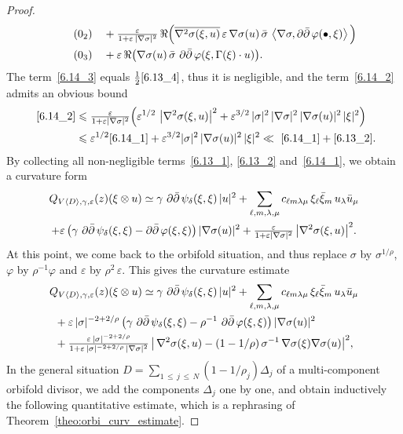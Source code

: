 \documentclass[AHL,Unicode,longabstracts,published]{cedram}
\DeclareMathOperator{\ddbar}{\partial\bar\partial}
\DeclarePairedDelimiter{\abs}{\lvert}{\rvert}
\let\leq\leqslant
\begin{document}
\begin{proof}
\begin{align}
\tag{$\theequation_2$}\label{6.14_2}
&\quad{}+\tfrac{\varepsilon}{ 1+\varepsilon\,\abs{\nabla\sigma}^2}\,\Re\Big(
\overline{\nabla^2\sigma(\xi,u)}\,
\varepsilon\,\nabla\sigma(u)\,\bar\sigma\,
\left\langle\nabla\sigma,\ddbar\varphi(\bullet,\xi)\right\rangle\Big)
\\
\tag{$\theequation_3$}\label{6.14_3}
&\quad{}+\varepsilon\,\Re\big(
\nabla\sigma(u)\,\bar\sigma\,
\ddbar\varphi(\xi,\Gamma(\xi)\cdot u)\big).
\end{align}
The term~\eqref{6.14_3} equals $\tfrac{1}{2}\eqref{6.13_4}$, thus it is negligible, and the term~\eqref{6.14_2} admits an obvious bound
\begin{align*}
~\eqref{6.14_2} &\leq
\tfrac{\varepsilon}{ 1+\varepsilon\abs{\nabla\sigma}^2}
\Big(\varepsilon^{1/2}\,\left|\nabla^2\sigma(\xi,u)\right|^2+\varepsilon^{3/2}\,
\abs{\sigma}^2\,\abs{\nabla\sigma}^2\,\abs{\nabla\sigma(u)}^2\,\abs{\xi}^2\Big)\\
&\leq
\varepsilon^{1/2}\eqref{6.14_1}+
\varepsilon^{3/2}\abs{\sigma}^2\,\abs{\nabla\sigma(u)}^2\,\abs{\xi}^2\ll~\eqref{6.14_1}+\eqref{6.13_2}.
\end{align*}
By collecting all non-negligible terms~\eqref{6.13_1}, \eqref{6.13_2} and~\eqref{6.14_1}, we obtain a curvature form
\begin{multline*}
Q_{V\langle D\rangle,\gamma,\varepsilon}(z)(\xi\otimes u)
\simeq{}\gamma\,\ddbar\psi_\delta(\xi,\xi)\,\abs{u}^2 +\sum_{\ell,m,\lambda,\mu}c_{\ell m\lambda\mu}\,\xi_\ell\bar\xi_m\, u_\lambda\bar u_\mu\\
+\varepsilon\,
\big(\gamma\,\ddbar\psi_\delta(\xi,\xi)-\ddbar\varphi(\xi,\xi)\big)
\,\abs{\nabla\sigma(u)}^2 +\tfrac{\varepsilon}{ 1+\varepsilon\abs{\nabla\sigma}^2}\,
\abs*{\nabla^2\sigma(\xi,u)}^2.
\end{multline*}
At this point, we come back to the orbifold situation, and thus replace $\sigma$ by $\sigma^{1/\rho}$,
$\varphi$ by $\rho^{-1}\varphi$ and $\varepsilon$ by
$\rho^2\,\varepsilon$. This gives the curvature estimate
\begin{multline}
Q_{V\langle D\rangle,\gamma,\varepsilon}(z)(\xi\otimes u)\simeq{}
\gamma\,\ddbar\psi_\delta(\xi,\xi)\,\abs{u}^2 +\sum_{\ell,m,\lambda,\mu}c_{\ell m\lambda\mu}\,\xi_\ell\bar\xi_m\, u_\lambda\bar u_\mu\\
\begin{aligned}
&+\varepsilon\,\abs{\sigma}^{-2+2/\rho}\,
\big(\gamma\,\ddbar\psi_\delta(\xi,\xi)-\rho^{-1}\,\ddbar\varphi(\xi,\xi)\big)
\,\abs{\nabla\sigma(u)}^2
\\
&+\tfrac{\varepsilon\,\abs{\sigma}^{-2+2/\rho}}{ 1+\varepsilon\,\abs{\sigma}^{-2+2/\rho}\,
\abs{\nabla\sigma}^2}\,\big|\,\nabla^2\sigma(\xi,u) -(1-1/\rho)\,\sigma^{-1}\,\nabla\sigma(\xi)\nabla\sigma(u)\big|^2,
\end{aligned}
\end{multline}
In the general situation $D=\sum_{1\,\leq\,j\,\leq\,N}(1-1/\rho_j)\Delta_j$ of a multi-component orbifold divisor, we add the components $\Delta_j$ one by one, and obtain inductively the following quantitative estimate, which is a rephrasing of Theorem~\ref{theo:orbi_curv_estimate}.
\end{proof}
\end{document}
